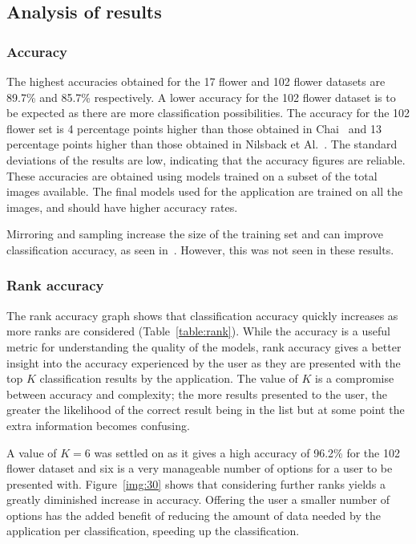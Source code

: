 \documentclass[11pt, a4paper]{report}
\begin{document}
\subsection{Analysis of results}

\subsubsection{Accuracy}

The highest accuracies obtained for the 17 flower and 102 flower datasets are 89.7\% and 85.7\% respectively. A lower accuracy for the 102 flower dataset is to be expected as there are more classification possibilities. The accuracy for the 102 flower set is 4 percentage points higher than those obtained in Chai~\cite{LitRev:Chai} and 13 percentage points higher than those obtained in Nilsback et Al.~\cite{Nilsback08}. The standard deviations of the results are low, indicating that the accuracy figures are reliable. These accuracies are obtained using models trained on a subset of the total images available. The final models used for the application are trained on all the images, and should have higher accuracy rates.

Mirroring and sampling increase the size of the training set and can improve classification accuracy, as seen in~\cite{Chatfield14}. However, this was not seen in these results.

\subsubsection{Rank accuracy}


The rank accuracy graph shows that classification accuracy quickly increases as more ranks are considered (Table~\ref{table:rank}). While the accuracy is a useful metric for understanding the quality of the models, rank accuracy gives a better insight into the accuracy experienced by the user as they are presented with the top $K$ classification results by the application. The value of $K$ is a compromise between accuracy and complexity; the more results presented to the user, the greater the likelihood of the correct result being in the list but at some point the extra information becomes confusing. 

A value of $K = 6$ was settled on as it gives a high accuracy of 96.2\% for the 102 flower dataset and six is a very manageable number of options for a user to be presented with. Figure~\ref{img:30} shows that considering further ranks yields a greatly diminished increase in accuracy. Offering the user a smaller number of options has the added benefit of reducing the amount of data needed by the application per classification, speeding up the classification.
\end{document}

